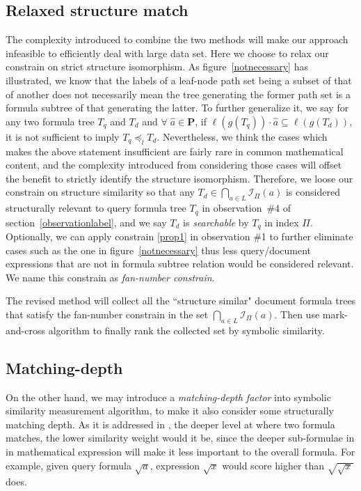 \subsection{Relaxed structure match}
The complexity introduced to combine the two methods will make our approach infeasible to efficiently deal with large data set. 
Here we choose to relax our constrain on strict structure isomorphism. 
As figure~\ref{notnecessary} has illustrated, we know that the labels of a leaf-node path set being a subset of that of another does not necessarily mean the tree generating the former path set is a formula subtree of that generating the latter.
To further generalize it, we say for any two formula tree $T_q$ and $T_d$ and $\forall\; \hat{a} \in \mathbf{P}$, if $\ell(g(T_q)) \cdot \hat{a} \subseteq \ell(g(T_d))$, it is not sufficient to imply $T_q \preceq_l T_d$.
Nevertheless, we think the cases which makes the above statement insufficient are fairly rare in common mathematical content, and the complexity introduced from considering those cases will offset the benefit to strictly identify the structure isomorphism.
Therefore, we loose our constrain on structure similarity so that any  $T_d \in \bigcap_{a \in L} \mathcal{I}_{\Pi}(a) $ is considered structurally relevant to query formula tree $T_q$ in observation~\#4 of section~\ref{observationlabel},
and we say $T_d$ is \textit{searchable} by $T_q$ in index $\Pi$.
Optionally, we can apply constrain \ref{prop1} in observation \#1 to further eliminate cases such as the one in figure~\ref{notnecessary} thus less query/document expressions that are not in formula subtree relation would be considered relevant. We name this constrain as \textit{fan-number constrain}.

The revised method will collect all the ``structure similar" document formula trees that satisfy the fan-number constrain in the set $\bigcap_{a \in L} \mathcal{I}_{\Pi}(a)$. 
Then use mark-and-cross algorithm to finally rank the collected set by symbolic similarity.

\subsection{Matching-depth}
On the other hand, we may introduce a \textit{matching-depth factor} into symbolic similarity measurement algorithm, to make it also consider some structurally matching depth. 
As it is addressed in \cite{mias11a}, the deeper level at where two formula matches, the lower similarity weight would it be, since the deeper sub-formulae in in mathematical expression will make it less important to the overall formula.
For example, given query formula $\sqrt a$, expression $\sqrt {x}$ would score higher than $\sqrt{\sqrt{x}}$ does. 

